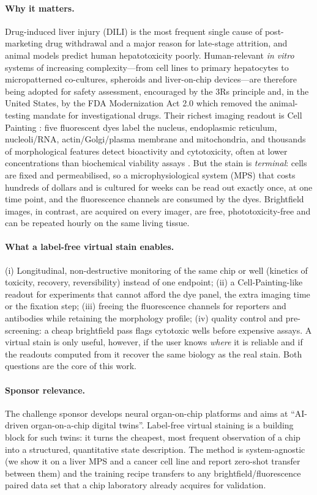 \documentclass[11pt,a4paper]{article}
\begin{document}
\paragraph{Why it matters.}
Drug-induced liver injury (DILI) is the most frequent single cause of post-marketing drug withdrawal and a major reason for late-stage attrition, and animal models predict human hepatotoxicity poorly. Human-relevant \emph{in vitro} systems of increasing complexity---from cell lines to primary hepatocytes to micropatterned co-cultures, spheroids and liver-on-chip devices---are therefore being adopted for safety assessment, encouraged by the 3Rs principle and, in the United States, by the FDA Modernization Act 2.0 which removed the animal-testing mandate for investigational drugs. Their richest imaging readout is Cell Painting \cite{bray2016}: five fluorescent dyes label the nucleus, endoplasmic reticulum, nucleoli/RNA, actin/Golgi/plasma membrane and mitochondria, and thousands of morphological features detect bioactivity and cytotoxicity, often at lower concentrations than biochemical viability assays \cite{ewald2025}. But the stain is \emph{terminal}: cells are fixed and permeabilised, so a microphysiological system (MPS) that costs hundreds of dollars and is cultured for weeks can be read out exactly once, at one time point, and the fluorescence channels are consumed by the dyes. Brightfield images, in contrast, are acquired on every imager, are free, phototoxicity-free and can be repeated hourly on the same living tissue.

\paragraph{What a label-free virtual stain enables.}
(i) Longitudinal, non-destructive monitoring of the same chip or well (kinetics of toxicity, recovery, reversibility) instead of one endpoint; (ii) a Cell-Painting-like readout for experiments that cannot afford the dye panel, the extra imaging time or the fixation step; (iii) freeing the fluorescence channels for reporters and antibodies while retaining the morphology profile; (iv) quality control and pre-screening: a cheap brightfield pass flags cytotoxic wells before expensive assays. A virtual stain is only useful, however, if the user knows \emph{where} it is reliable and if the readouts computed from it recover the same biology as the real stain. Both questions are the core of this work.

\paragraph{Sponsor relevance.}
The challenge sponsor develops neural organ-on-chip platforms and aims at ``AI-driven organ-on-a-chip digital twins''. Label-free virtual staining is a building block for such twins: it turns the cheapest, most frequent observation of a chip into a structured, quantitative state description. The method is system-agnostic (we show it on a liver MPS and a cancer cell line and report zero-shot transfer between them) and the training recipe transfers to any brightfield/fluorescence paired data set that a chip laboratory already acquires for validation.
\end{document}
